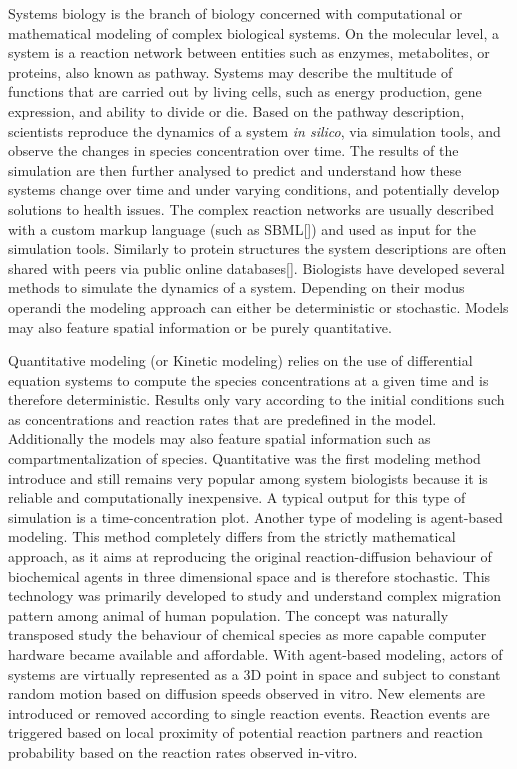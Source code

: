 Systems biology is the branch of biology concerned with computational or mathematical modeling of complex biological systems.
On the molecular level, a system is a reaction network between entities such as enzymes, metabolites, or proteins, also known as pathway.
Systems may describe the multitude of functions that are carried out by living cells, such as energy production, gene expression, and ability to divide or die.
Based on the pathway description, scientists reproduce the dynamics of a system \textit{in silico}, via simulation tools, and observe the changes in species concentration over time.
The results of the simulation are then further analysed to predict and understand how these systems change over time and under varying conditions, and potentially develop solutions to health issues.
The complex reaction networks are usually described with a custom markup language (such as SBML[]) and used as input for the simulation tools.
Similarly to protein structures the system descriptions are often shared with peers via public online databases[].
Biologists have developed several methods to simulate the dynamics of a system.
Depending on their modus operandi the modeling approach can either be deterministic or stochastic.
Models may also feature spatial information or be purely quantitative. 


Quantitative modeling (or Kinetic modeling) relies on the use of differential equation systems to compute the species concentrations at a given time and is therefore deterministic.
Results only vary according to the initial conditions such as concentrations and reaction rates that are predefined in the model.
Additionally the models may also feature spatial information such as compartmentalization of species.
Quantitative was the first modeling method introduce and still remains very popular among system biologists because it is reliable and computationally inexpensive.
A typical output for this type of simulation is a time-concentration plot.
Another type of modeling is agent-based modeling.
This method completely differs from the strictly mathematical approach, as it aims at reproducing the original reaction-diffusion behaviour of biochemical agents in three dimensional space and is therefore stochastic.
This technology was primarily developed to study and understand complex migration pattern among animal of human population.
The concept was naturally transposed study the behaviour of chemical species as more capable computer hardware became available and affordable.
With agent-based modeling, actors of systems are virtually represented as a 3D point in space and subject to constant random motion based on diffusion speeds observed in vitro.
New elements are introduced or removed according to single reaction events.
Reaction events are triggered based on local proximity of potential reaction partners and reaction probability based on the reaction rates observed in-vitro.


